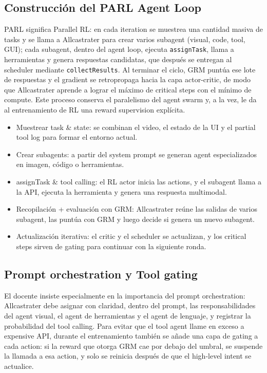\subsection{Construcción del PARL Agent Loop}
PARL significa Parallel RL: en cada iteration se muestrea una cantidad masiva de tasks y se llama a Allcastrater para crear varios subagent (visual, code, tool, GUI); cada subagent, dentro del agent loop, ejecuta \texttt{assignTask}, llama a herramientas y genera respuestas candidatas, que después se entregan al scheduler mediante \texttt{collectResults}. Al terminar el ciclo, GRM puntúa ese lote de respuestas y el gradient se retropropaga hacia la capa actor-critic, de modo que Allcastrater aprende a lograr el máximo de critical steps con el mínimo de compute. Este proceso conserva el paralelismo del agent swarm y, a la vez, le da al entrenamiento de RL una reward supervision explícita.
\begin{itemize}
    \item Muestrear task \& state: se combinan el video, el estado de la UI y el partial tool log para formar el entorno actual.
    \item Crear subagents: a partir del system prompt se generan agent especializados en imagen, código o herramientas.
    \item assignTask \& tool calling: el RL actor inicia las actions, y el subagent llama a la API, ejecuta la herramienta y genera una respuesta multimodal.
    \item Recopilación + evaluación con GRM: Allcastrater reúne las salidas de varios subagent, las puntúa con GRM y luego decide si genera un nuevo subagent.
    \item Actualización iterativa: el critic y el scheduler se actualizan, y los critical steps sirven de gating para continuar con la siguiente ronda.
\end{itemize}

\subsection{Prompt orchestration y Tool gating}
El docente insiste especialmente en la importancia del prompt orchestration: Allcastrater debe asignar con claridad, dentro del prompt, las responsabilidades del agent visual, el agent de herramientas y el agent de lenguaje, y registrar la probabilidad del tool calling. Para evitar que el tool agent llame en exceso a expensive API, durante el entrenamiento también se añade una capa de gating a cada action: si la reward que otorga GRM cae por debajo del umbral, se suspende la llamada a esa action, y solo se reinicia después de que el high-level intent se actualice.


